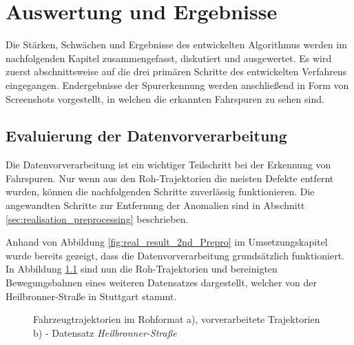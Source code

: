 
\chapter{Auswertung und Ergebnisse}
\label{cha:results}

Die Stärken, Schwächen und Ergebnisse des entwickelten Algorithmus werden im nachfolgenden Kapitel
zusammengefasst, diskutiert und ausgewertet. Es wird zuerst abschnittsweise auf die drei primären Schritte
des entwickelten Verfahrens eingegangen. Endergebnisse der Spurerkennung werden anschließend
in Form von Screenshots vorgestellt, in welchen die erkannten Fahrspuren zu sehen sind.

\section{Evaluierung der Datenvorverarbeitung}
\label{sec:results_eval_dataprocessing}

Die Datenvorverarbeitung ist ein wichtiger Teilschritt bei der Erkennung von Fahrspuren. Nur wenn aus
den Roh-Trajektorien die meisten Defekte entfernt wurden, können die nachfolgenden
Schritte zuverlässig funktionieren. Die angewandten Schritte zur
Entfernung der Anomalien sind in Abschnitt \ref{sec:realisation_preprocessing} beschrieben.

Anhand von Abbildung \ref{fig:real_result_2nd_Prepro} im Umsetzungskapitel wurde bereits gezeigt,
dass die Datenvorverarbeitung grundsätzlich funktioniert.
In Abbildung \ref{fig:results_prePro_heilbronner} sind nun die Roh-Trajektorien und bereinigten Bewegungsbahnen
eines weiteren Datensatzes dargestellt, welcher von der Heilbronner-Straße in Stuttgart stammt.

\begin{figure}[H]
    \centering
    \qquad \qquad
    \caption[Ergebnis Trajektorie-Vorverarbeitung der Heilbronner-Straße]
            {Fahrzeugtrajektorien im Rohformat a), vorverarbeitete Trajektorien b) - Datensatz \textit{Heilbronner-Straße}}
    \label{fig:results_prePro_heilbronner}
\end{figure}

